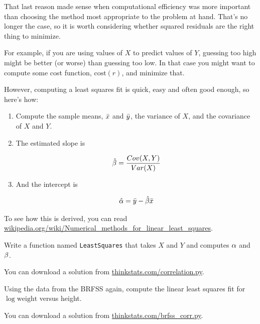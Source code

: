 \documentclass[12pt]{book}
\begin{document}
That last reason made sense when computational efficiency was more
important than choosing the method most appropriate to the problem
at hand.  That's no longer the case, so it is worth considering
whether squared residuals are the right thing to minimize.

For example, if you are using values of $X$ to predict values of $Y$,
guessing too high might be better (or worse) than guessing too low.
In that case you might want to compute some cost function,
$\mathrm{cost}(r)$, and minimize that.

However, computing a least squares fit is quick, easy and often good
enough, so here's how:

\begin{enumerate}

\item Compute the sample means, $\bar{x}$ and $\bar{y}$, the variance
of $X$, and the covariance of $X$ and $Y$.

\item The estimated slope is

\[ \hat{\beta} = \frac{Cov(X,Y)}{Var(X)} \]

\item And the intercept is

\[ \hat{\alpha} = \bar{y} - \hat{\beta} \bar{x} \]

\end{enumerate}

To see how this is derived, you can read
\url{wikipedia.org/wiki/Numerical_methods_for_linear_least_squares}.


\begin{ex}

Write a function named {\tt LeastSquares} that takes $X$ and $Y$ and
computes $\alpha$ and $\beta$.

You can download a solution from
\url{thinkstats.com/correlation.py}.

\end{ex}

\begin{ex}

Using the data from the BRFSS again, compute the linear least squares
fit for $\log \mathrm{weight}$ versus height.

You can download a solution from
\url{thinkstats.com/brfss_corr.py}.

\end{ex}
\end{document}
